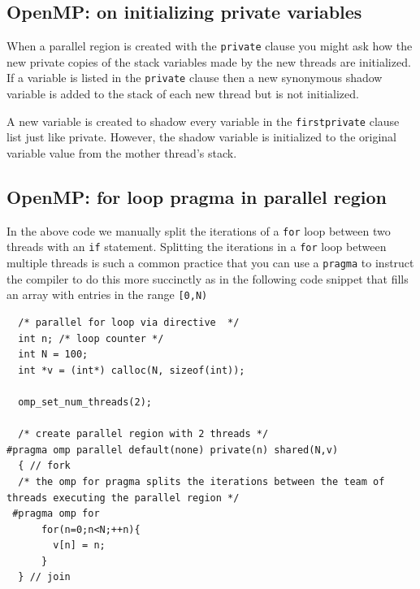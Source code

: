 \subsection{OpenMP: on initializing private variables}

When  a parallel region is created with the \texttt{private} clause you might ask how the new private copies of the stack variables made by the new threads are initialized. If a variable is listed in the \texttt{private} clause then a new synonymous shadow variable is added to the stack of each new thread but is not initialized.

A new variable is created to shadow every variable in the \texttt{firstprivate} clause list just like private. However, the shadow variable is initialized to the original variable value from the mother thread's stack.


\subsection{OpenMP:  for loop pragma in parallel region}

In the above code we manually split the iterations of a \texttt{for} loop between two threads with an \texttt{if} statement. Splitting the iterations in a \texttt{for} loop between multiple threads is such a common practice that you can use a \texttt{pragma} to instruct the compiler to do this more succinctly as in the following code snippet that fills an array with entries in the range \texttt{[0,N)}

\begin{verbatim}
  /* parallel for loop via directive  */
  int n; /* loop counter */
  int N = 100;
  int *v = (int*) calloc(N, sizeof(int));

  omp_set_num_threads(2);

  /* create parallel region with 2 threads */
#pragma omp parallel default(none) private(n) shared(N,v)
  { // fork
  /* the omp for pragma splits the iterations between the team of threads executing the parallel region */
 #pragma omp for
      for(n=0;n<N;++n){
        v[n] = n; 
      }
  } // join     
\end{verbatim}

